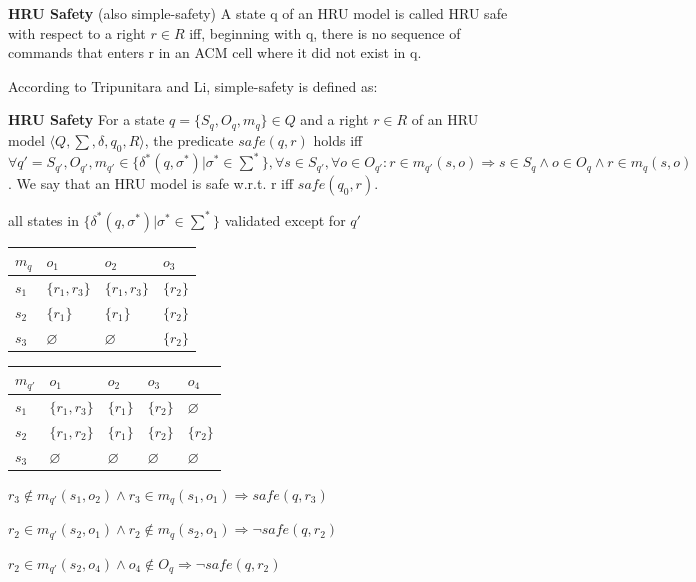 \documentclass[a4paper]{article}
\renewcommand{\note}[2]{\begin{noteBox} \textbf{#1} #2 \end{noteBox}}
\begin{document}
\begin{multicols}{3}
    \note{HRU Safety}{(also simple-safety) A state q of an HRU model is called HRU safe with respect to a right $r\in R$ iff, beginning with q, there is no sequence of commands that enters r in an ACM cell where it did not exist in q.}

    According to Tripunitara and Li, simple-safety is defined as:

    \note{HRU Safety}{For a state $q=\{S_q,O_q,m_q\}\in Q$ and a right $r\in R$ of an HRU model $\langle Q,\sum,\delta,q_0,R\rangle$, the predicate $safe(q,r)$ holds iff
    $\forall q'= S_{q'},O_{q'},m_{q'} \in \{\delta^*(q,\sigma^*)|\sigma^*\in\sum^*\},\forall s\in S_{q'},\forall o\in O_{q'}: r\in m_{q'}(s,o)\Rightarrow s\in S_q \wedge o\in O_q \wedge r\in m_q(s,o)$.
    We say that an HRU model is safe w.r.t. r iff $safe(q_0 ,r)$.}

    all states in $\{\delta^*(q,\sigma^*)|\sigma^*\in\sum^*\}$ validated except for $q'$
    \begin{tabular}{l|l|l|l}
        $m_q$ & $o_1$         & $o_2$         & $o_3$     \\\hline
        $s_1$ & $\{r_1,r_3\}$ & $\{r_1,r_3\}$ & $\{r_2\}$ \\
        $s_2$ & $\{r_1\}$     & $\{r_1\}$     & $\{r_2\}$ \\
        $s_3$ & $\varnothing$ & $\varnothing$ & $\{r_2\}$
    \end{tabular}
    \begin{tabular}{l|l|l|l|l}
        $m_{q'}$ & $o_1$         & $o_2$         & $o_3$         & $o_4$         \\\hline
        $s_1$    & $\{r_1,r_3\}$ & $\{r_1\}$     & $\{r_2\}$     & $\varnothing$ \\
        $s_2$    & $\{r_1,r_2\}$ & $\{r_1\}$     & $\{r_2\}$     & $\{r_2\}$     \\
        $s_3$    & $\varnothing$ & $\varnothing$ & $\varnothing$ & $\varnothing$
    \end{tabular}
    \begin{itemize*}
        \item $r_3\not\in m_{q'}(s_1,o_2)\wedge r_3\in m_q(s_1,o_1)\Rightarrow safe(q,r_3)$
        \item $r_2\in m_{q'}(s_2,o_1)\wedge r_2 \not\in m_q(s_2,o_1)\Rightarrow\lnot safe(q,r_2)$
        \item $r_2\in m_{q'}(s_2,o_4)\wedge o_4\not\in O_q\Rightarrow\lnot safe(q,r_2)$
    \end{itemize*}


\end{multicols}
\end{document}

